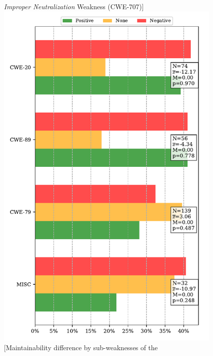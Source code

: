 \documentclass[10pt,conference]{IEEEtran}
\begin{document}
\begin{figure}[htp]
  \textit{Improper Neutralization} Weakness (CWE-707)]{\includegraphics[scale=0.4]{figures/main_per_cwe_spec_707.pdf}}\quad\quad
    \subfigure[Maintainability difference by sub-weaknesses of the 

\end{figure}
\end{document}
